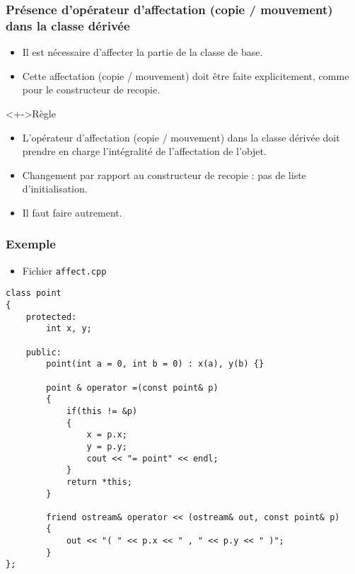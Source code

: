 \begin{frame}
\frametitle{Présence d'opérateur d'affectation (copie / mouvement) dans la classe dérivée}
\begin{itemize}[<+->]
\item Il est nécessaire d'affecter la partie de la classe de base.
\item Cette affectation (copie / mouvement) doit être faite explicitement, comme pour le constructeur de recopie.
\end{itemize}
\begin{exampleblock}<+->{Règle}
	\begin{itemize}[<+->]
	\item L'opérateur d'affectation (copie / mouvement) dans la classe dérivée doit prendre en charge l'intégralité de l'affectation de l'objet.
	\end{itemize}
\end{exampleblock}
\begin{itemize}[<+->]
\item Changement par rapport au constructeur de recopie : pas de liste d'initialisation.
\item Il faut faire autrement.
\end{itemize}
\end{frame}

\begin{frame}[containsverbatim]
\frametitle{Exemple}
\begin{itemize}
\item Fichier \texttt{affect.cpp}
\end{itemize}
\begin{lstlisting}
class point
{
	protected:
		int x, y;
	
	public:
		point(int a = 0, int b = 0) : x(a), y(b) {}		

		point & operator =(const point& p)
		{
			if(this != &p)
			{
				x = p.x;
				y = p.y;
				cout << "= point" << endl;
			}
			return *this;
		}	

		friend ostream& operator << (ostream& out, const point& p)
		{
			out << "( " << p.x << " , " << p.y << " )";
		}
};
\end{lstlisting}
\end{frame}

